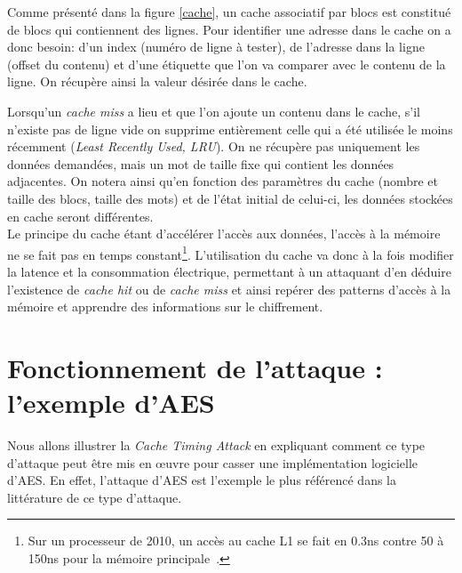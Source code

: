 \documentclass[a4paper,11pt]{article}
\begin{document}
Comme présenté dans la figure \ref{cache}, un cache associatif par blocs est constitué de blocs qui contiennent des lignes. Pour identifier une adresse dans le cache on a donc besoin: d'un index (numéro de ligne à tester), de l'adresse dans la ligne (offset du contenu) et d'une étiquette que l'on va comparer avec le contenu de la ligne. On récupère ainsi la valeur désirée dans le cache. 

Lorsqu'un \emph{cache miss} a lieu et que l'on ajoute un contenu dans le cache, s'il n'existe pas de ligne vide on supprime entièrement celle qui a été utilisée le moins récemment (\emph{Least Recently Used, LRU}). On ne récupère pas uniquement les données demandées, mais un mot de taille fixe qui contient les données adjacentes. On notera ainsi qu'en fonction des paramètres du cache (nombre et taille des blocs, taille des mots) et de l'état initial de celui-ci, les données stockées en cache seront différentes.\\


Le principe du cache étant d'accélérer l'accès aux données, l'accès à la mémoire ne se fait pas en temps constant\footnote{Sur un processeur de 2010, un accès au cache L1 se fait en 0.3ns contre 50 à 150ns pour la mémoire principale~\cite{tromer2010efficient}.}. L'utilisation du cache va donc à la fois modifier la latence et la consommation électrique, permettant à un attaquant d'en déduire l'existence de \emph{cache hit} ou de \emph{cache miss} et ainsi repérer des patterns d'accès à la mémoire et apprendre des informations sur le chiffrement.



\section{Fonctionnement de l'attaque : l'exemple d'AES}

Nous allons illustrer la \emph{Cache Timing Attack} en expliquant comment ce type d'attaque peut être mis en \oe uvre pour casser une implémentation logicielle d'AES. En effet, l'attaque d'AES est l'exemple le plus référencé dans la littérature de ce type d'attaque.
\end{document}
